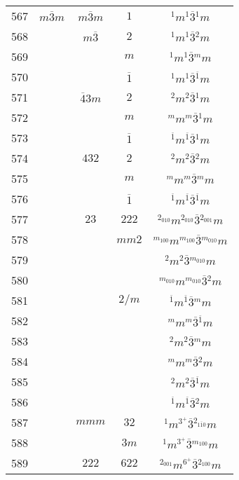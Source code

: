 \begin{longtable}{ccccc}
  567 & $m\overline{3}m$ & $m\overline{3}m$ & $1$ & ${}^{1} m {}^{1} \overline{3} {}^{1} m $\\
  568 &  & $m\overline{3}$ & $2$ & ${}^{1} m {}^{1} \overline{3} {}^{2} m $\\
  569 &  &  & $m$ & ${}^{1} m {}^{1} \overline{3} {}^{m} m $\\
  570 &  &  & $\overline{1}$ & ${}^{1} m {}^{1} \overline{3} {}^{\overline{1}} m $\\
  571 &  & $\overline{4}3m$ & $2$ & ${}^{2} m {}^{2} \overline{3} {}^{1} m $\\
  572 &  &  & $m$ & ${}^{m} m {}^{m} \overline{3} {}^{1} m $\\
  573 &  &  & $\overline{1}$ & ${}^{\overline{1}} m {}^{\overline{1}} \overline{3} {}^{1} m $\\
  574 &  & $432$ & $2$ & ${}^{2} m {}^{2} \overline{3} {}^{2} m $\\
  575 &  &  & $m$ & ${}^{m} m {}^{m} \overline{3} {}^{m} m $\\
  576 &  &  & $\overline{1}$ & ${}^{\overline{1}} m {}^{\overline{1}} \overline{3} {}^{\overline{1}} m $\\
  577 &  & $23$ & $222$ & ${}^{2_{010}} m {}^{2_{010}} \overline{3} {}^{2_{001}} m $\\
  578 &  &  & $mm2$ & ${}^{m_{100}} m {}^{m_{100}} \overline{3} {}^{m_{010}} m $\\
  579 &  &  &  & ${}^{2} m {}^{2} \overline{3} {}^{m_{010}} m $\\
  580 &  &  &  & ${}^{m_{010}} m {}^{m_{010}} \overline{3} {}^{2} m $\\
  581 &  &  & $2/m$ & ${}^{\overline{1}} m {}^{\overline{1}} \overline{3} {}^{m} m $\\
  582 &  &  &  & ${}^{m} m {}^{m} \overline{3} {}^{\overline{1}} m $\\
  583 &  &  &  & ${}^{2} m {}^{2} \overline{3} {}^{m} m $\\
  584 &  &  &  & ${}^{m} m {}^{m} \overline{3} {}^{2} m $\\
  585 &  &  &  & ${}^{2} m {}^{2} \overline{3} {}^{\overline{1}} m $\\
  586 &  &  &  & ${}^{\overline{1}} m {}^{\overline{1}} \overline{3} {}^{2} m $\\
  587 &  & $mmm$ & $32$ & ${}^{1} m {}^{3^{+}} \overline{3} {}^{2_{1\overline{1}0}} m $\\
  588 &  &  & $3m$ & ${}^{1} m {}^{3^{+}} \overline{3} {}^{m_{100}} m $\\
  589 &  & $222$ & $622$ & ${}^{2_{001}} m {}^{6^{+}} \overline{3} {}^{2_{100}} m $\\

\end{longtable}
